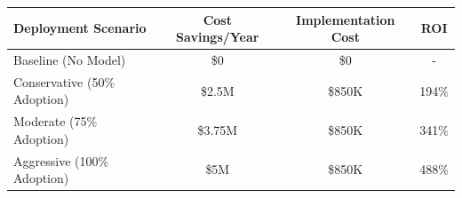 \begin{tabular}{|l|c|c|c|}
\hline
\textbf{Deployment Scenario} & \textbf{Cost Savings/Year} & \textbf{Implementation Cost} & \textbf{ROI} \\
\hline
Baseline (No Model) & \$0 & \$0 & - \\
\hline
Conservative (50\% Adoption) & \$2.5M & \$850K & 194\% \\
\hline
Moderate (75\% Adoption) & \$3.75M & \$850K & 341\% \\
\hline
Aggressive (100\% Adoption) & \$5M & \$850K & 488\% \\
\hline
\end{tabular}

